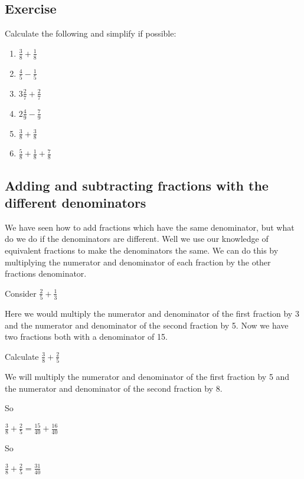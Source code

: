 \subsection{Exercise}
Calculate the following and simplify if possible:
\begin{multicols}{2}
\begin{enumerate}
	\item $\displaystyle \frac{3}{8} + \frac{1}{8}$
	\item $\displaystyle \frac{4}{5} - \frac{1}{5}$
	\item $\displaystyle 3 \frac{2}{7} + \frac{2}{7}$
	\item $\displaystyle 2 \frac{4}{9} - \frac{7}{9}$
	\item $\displaystyle \frac{3}{8} + \frac{3}{8}$
	\item $\displaystyle \frac{5}{8} + \frac{1}{8} + \frac{7}{8}$
\end{enumerate}
\end{multicols}

\subsection{Adding and subtracting fractions with the different denominators}
We have seen how to add fractions which have the same denominator, but what do we do if the denominators are different.  Well we use our knowledge of equivalent fractions to make the denominators the same.  We can do this by multiplying the numerator and denominator of each fraction by the other fractions denominator.

\bigskip

\noindent Consider $\displaystyle \frac{2}{5} + \frac{1}{3}$

\bigskip

\noindent Here we would multiply the numerator and denominator of the first fraction by 3 and the numerator and denominator of the second fraction by 5.  Now we have two fractions both with a denominator of 15.

\begin{exmp}
	Calculate $\displaystyle \frac{3}{8} + \frac{2}{5}$

	\bigskip

\noindent We will multiply the numerator and denominator of the first fraction by 5 and the numerator and denominator of the second fraction by 8.

\noindent So

	\bigskip

	$\displaystyle \frac{3}{8} + \frac{2}{5} = \frac{15}{40} + \frac{16}{40}$

	\bigskip

\noindent So

	\bigskip

	$\displaystyle \frac{3}{8} + \frac{2}{5} = \frac{31}{40}$
\end{exmp}


